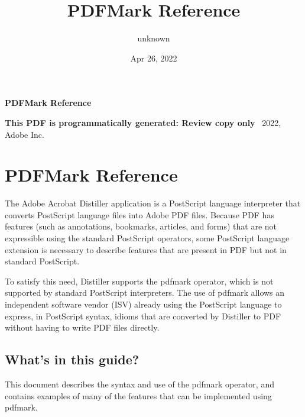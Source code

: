 \documentclass[letterpaper,12pt,english,openany,oneside]{sphinxmanual}
\title{PDFMark Reference}
\date{Apr 26, 2022}
\author{unknown}
\begin{document}
\pagestyle{empty}

    \begin{titlepage}
        \begin{figure}[h]
        \end{figure}
        \centering
        \vspace*{40mm}
        \textbf{\Huge PDFMark Reference}

        \vspace{15mm}
        \Large \textbf{{This PDF is programmatically generated: Review copy only}}
        \vfill
        \small \textcopyright\ 2022, Adobe Inc.
    \end{titlepage}
    \clearpage
    \tableofcontents
    \clearpage
    
\pagestyle{plain}

\pagestyle{normal}
\label{\detokenize{toc::doc}}





\chapter{PDFMark Reference}
\label{\detokenize{index:pdfmark-reference}}\label{\detokenize{index::doc}}
The Adobe Acrobat Distiller application is a PostScript language interpreter that converts PostScript language files into Adobe PDF files. Because PDF has features (such as annotations, bookmarks, articles, and forms) that are not expressible using the standard PostScript operators, some PostScript language extension is necessary to describe features that are present in PDF but not in standard PostScript.

To satisfy this need, Distiller supports the pdfmark operator, which is not supported by standard PostScript interpreters. The use of pdfmark allows an independent software vendor (ISV) already using the PostScript language to express, in PostScript syntax, idioms that are converted by Distiller to PDF without having to write PDF files directly.


\section{What’s in this guide?}
\label{\detokenize{index:whats-in-this-guide}}
This document describes the syntax and use of the pdfmark operator, and contains examples of many of the features that can be implemented using pdfmark.
\end{document}
